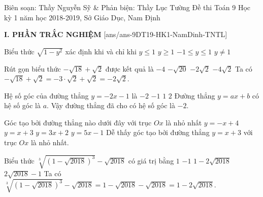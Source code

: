 \begin{name}
{Biên soạn: Thầy Nguyễn Sỹ \& Phản biện: Thầy Lục Tường}
{Đề thi Toán 9 Học kỳ 1 năm học 2018-2019, Sở Giáo Dục, Nam Định}
\end{name}
\noindent\textbf{I. PHẦN TRẮC NGHIỆM}
\setcounter{ex}{0}\setcounter{bt}{0}
[ans/ans-9DT19-HK1-NamDinh-TNTL]
\begin{ex}%
	Biểu thức $\sqrt{1-y^2}$ xác định khi và chỉ khi
	\choice
	{$y\leq 1$}
	{$y\geq 1$}
	{\True $-1\leq y \leq 1$}
	{$y\neq 1$}
\end{ex}

\begin{ex}%
	Rút gọn biểu thức $-\sqrt{18}+\sqrt{2}$ được kết quả là
		\choice
		{$-4$}
		{$-\sqrt{20}$}
		{\True $-2\sqrt{2}$}
		{$-4\sqrt{2}$}
		\loigiai
		{ Ta có $-\sqrt{18}+\sqrt{2}=-3\cdot \sqrt{2}+\sqrt{2}=-2\sqrt{2}$.
		}
	\end{ex}
\begin{ex}%
	Hệ số góc của đường thẳng $y=-2x-1$ là
	\choice
	{\True $-2$}
	{$-1$}
	{$1$}
	{$2$}
	\loigiai
	{ Đường thẳng $y=ax+b$ có hệ số góc là $a$. Vậy đường thẳng đã cho có hệ số góc là $-2$.
	}
\end{ex}

\begin{ex}%
	Góc tạo bởi đường thẳng nào dưới đây với trục $Ox$ là nhỏ nhất
	\choice
	{$y=-x+4$}
	{\True $y=x+3$}
	{$y=3x+2$}
	{$y=5x-1$}
	\loigiai
	{ Dễ thấy góc tạo bởi đường thẳng $y=x+3$ với trục $Ox$ là nhỏ nhất.
	}
\end{ex}

\begin{ex}%
	Biểu thức $\sqrt[3]{\left(1-\sqrt{2018}\right)^3}-\sqrt{2018}$ có giá trị bằng
	\choice
	{$1$}
	{$-1$}
	{\True $1-2\sqrt{2018}$}
	{$2\sqrt{2018}-1$}
	\loigiai
	{ Ta có $\sqrt[3]{\left(1-\sqrt{2018}\right)^3}-\sqrt{2018}= 1-\sqrt{2018}-\sqrt{2018}=1-2\sqrt{2018}$.
	}
\end{ex}

